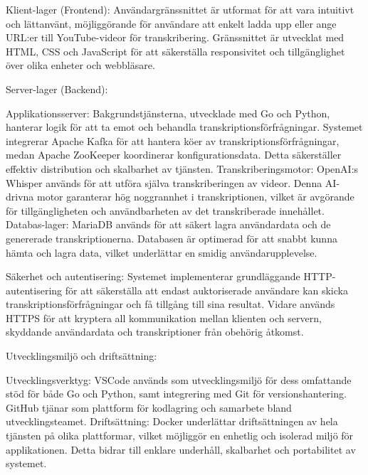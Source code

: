 Klient-lager (Frontend):
Användargränssnittet är utformat för att vara intuitivt och lättanvänt, möjliggörande för användare att enkelt ladda upp eller ange URL:er till YouTube-videor för transkribering. Gränssnittet är utvecklat med HTML, CSS och JavaScript för att säkerställa responsivitet och tillgänglighet över olika enheter och webbläsare.

Server-lager (Backend):

Applikationsserver: Bakgrundstjänsterna, utvecklade med Go och Python, hanterar logik för att ta emot och behandla transkriptionsförfrågningar. Systemet integrerar Apache Kafka för att hantera köer av transkriptionsförfrågningar, medan Apache ZooKeeper koordinerar konfigurationsdata. Detta säkerställer effektiv distribution och skalbarhet av tjänsten.
Transkriberingsmotor: OpenAI:s Whisper används för att utföra själva transkriberingen av videor. Denna AI-drivna motor garanterar hög noggrannhet i transkriptionen, vilket är avgörande för tillgängligheten och användbarheten av det transkriberade innehållet.
Databas-lager:
MariaDB används för att säkert lagra användardata och de genererade transkriptionerna. Databasen är optimerad för att snabbt kunna hämta och lagra data, vilket underlättar en smidig användarupplevelse.

Säkerhet och autentisering:
Systemet implementerar grundläggande HTTP-autentisering för att säkerställa att endast auktoriserade användare kan skicka transkriptionsförfrågningar och få tillgång till sina resultat. Vidare används HTTPS för att kryptera all kommunikation mellan klienten och servern, skyddande användardata och transkriptioner från obehörig åtkomst.

Utvecklingsmiljö och driftsättning:

Utvecklingsverktyg: VSCode används som utvecklingsmiljö för dess omfattande stöd för både Go och Python, samt integrering med Git för versionshantering. GitHub tjänar som plattform för kodlagring och samarbete bland utvecklingsteamet.
Driftsättning: Docker underlättar driftsättningen av hela tjänsten på olika plattformar, vilket möjliggör en enhetlig och isolerad miljö för applikationen. Detta bidrar till enklare underhåll, skalbarhet och portabilitet av systemet.
